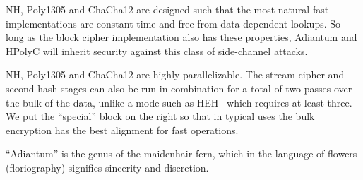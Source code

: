 \documentclass[eprint.tex]{subfiles}
\begin{document}
NH, Poly1305 and ChaCha12 are designed such that the most natural fast implementations are
constant-time and free from data-dependent lookups. So long as the block cipher implementation
also has these properties, Adiantum and HPolyC will inherit security against
this class of side-channel attacks.

NH, Poly1305 and ChaCha12 are highly parallelizable.
The stream cipher and second hash stages can also be run in combination for a total
of two passes over the bulk of the data, unlike a mode such as HEH~\cite{heh}
which requires at least three.
We put the ``special'' block on the right so that in typical uses the bulk encryption has
the best alignment for fast operations.

``Adiantum'' is the genus of the maidenhair fern, which in the language of
flowers (floriography) signifies sincerity and discretion.~\cite{fleurs}

\subbib
\end{document}
